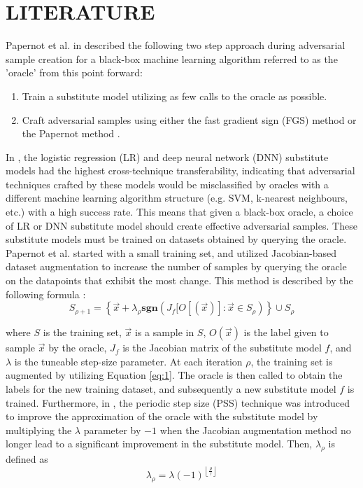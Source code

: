 \section{LITERATURE} \label{sec:literature}

Papernot et al. in \cite{papernot3} described the following two step approach during adversarial sample creation for a black-box machine learning algorithm referred to as the 'oracle' from this point forward:
\begin{enumerate}
\item \label{step1} Train a substitute model utilizing as few calls to the oracle as possible.  
\item \label{step2} Craft adversarial samples using either the fast gradient sign (FGS) method \cite{papernot3} or the Papernot method \cite{papernot2}. 
\end{enumerate}

In \cite{papernot3}, the logistic regression (LR) and deep neural network (DNN) substitute models had the highest cross-technique transferability, indicating that adversarial techniques crafted by these models would be misclassified by oracles with a different machine learning algorithm structure (e.g. SVM, k-nearest neighbours, etc.) with a high success rate. This means that given a black-box oracle, a choice of LR or DNN substitute model should create effective adversarial samples. These substitute models must be trained on datasets obtained by querying the oracle. Papernot et al. started with a small training set, and utilized Jacobian-based dataset augmentation to increase the number of samples by querying the oracle on the datapoints that exhibit the most change. This method is described by the following formula \cite{papernot3}:
\begin{equation} \label{eq:1}
	S_{\rho+1} = \left\{\vec{x} + \lambda_{\rho}\textbf{sgn}(J_{f}[O[(\vec{x})] : \vec{x} \in S_{\rho})\right\} \cup S_{\rho}
\end{equation}

where $S$ is the training set, $\vec{x}$ is a sample in $S$, $O(\vec{x})$ is the label given to sample $\vec{x}$ by the oracle, $J_{f}$ is the Jacobian matrix of the substitute model $f$, and $\lambda$ is the tuneable step-size parameter. At each iteration $\rho$, the training set is augmented by utilizing Equation \ref{eq:1}. The oracle is then called to obtain the labels for the new training dataset, and subsequently a new substitute model $f$ is trained. Furthermore, in \cite{papernot3}, the periodic step size (PSS) technique was introduced to improve the approximation of the oracle with the substitute model by multiplying the $\lambda$ parameter by $-1$ when the Jacobian augmentation method no longer lead to a significant improvement in the substitute model. Then, $\lambda_{\rho}$ is defined as
\begin{equation}
	\lambda_{\rho} = \lambda(-1)^{\left \lfloor \frac{\rho}{\tau} \right \rfloor}    
\end{equation}

